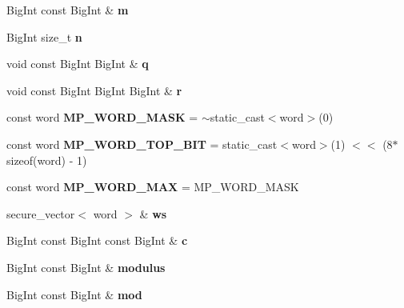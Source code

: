 \begin{DoxyCompactItemize}
Big\+Int const Big\+Int \& {\bfseries m}
\item 
\mbox{\label{namespace_botan_a9f704df25b8e57c03bc8125c1f82f971}} 
Big\+Int size\+\_\+t {\bfseries n}
\item 
\mbox{\label{namespace_botan_affe4f8a154009de5159500f03f51432c}} 
void const Big\+Int Big\+Int \& {\bfseries q}
\item 
\mbox{\label{namespace_botan_a5ebbd9f812be8a3bc0115320e7f7d70d}} 
void const Big\+Int Big\+Int Big\+Int \& {\bfseries r}
\item 
\mbox{\label{namespace_botan_a0c38d27275dc77ce3ac9b0280398f8a5}} 
const word {\bfseries M\+P\+\_\+\+W\+O\+R\+D\+\_\+\+M\+A\+SK} = $\sim$static\+\_\+cast$<$word$>$(0)
\item 
\mbox{\label{namespace_botan_a5f6a2a30f03aae788e45dd0807fb8904}} 
const word {\bfseries M\+P\+\_\+\+W\+O\+R\+D\+\_\+\+T\+O\+P\+\_\+\+B\+IT} = static\+\_\+cast$<$word$>$(1) $<$$<$ (8$\ast$sizeof(word) -\/ 1)
\item 
\mbox{\label{namespace_botan_a166ad6dc95d5e2034d9c769b39395626}} 
const word {\bfseries M\+P\+\_\+\+W\+O\+R\+D\+\_\+\+M\+AX} = M\+P\+\_\+\+W\+O\+R\+D\+\_\+\+M\+A\+SK
\item 
\mbox{\label{namespace_botan_a9402ed99fea4c227e79749b10505dc4e}} 
secure\+\_\+vector$<$ word $>$ \& {\bfseries ws}
\item 
\mbox{\label{namespace_botan_a1e64c91f05991b0a02079e0ba3225ff8}} 
Big\+Int const Big\+Int const Big\+Int \& {\bfseries c}
\item 
\mbox{\label{namespace_botan_a8d69890b04eee09076549d41931e11de}} 
Big\+Int const Big\+Int \& {\bfseries modulus}
\item 
\mbox{\label{namespace_botan_a6330856f1c9ef8c750e0c95105b1c79d}} 
Big\+Int const Big\+Int \& {\bfseries mod}
\item 
\mbox{\label{namespace_botan_a1c1e899cf8ed8ddd0da7fbeb49db22fc}} 
$$
\end{DoxyCompactItemize}
